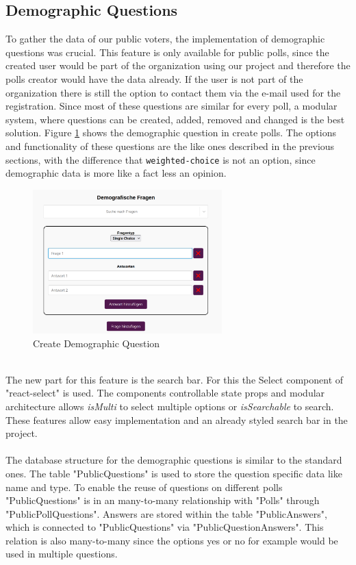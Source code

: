 \documentclass[a4paper,12pt]{report}
\begin{document}
\subsection{Demographic Questions}
To gather the data of our public voters, the implementation of demographic questions was crucial. This feature is only available for public polls, since the created user would be part of the organization using our project and therefore the polls creator would have the data already. If the user is not part of the organization there is still the option to contact them via the e-mail used for the registration. Since most of these questions are similar for every poll, a modular system, where questions can be created, added, removed and changed is the best solution. Figure \ref{fig:create_dem_que} shows the demographic question in create polls. The options and functionality of these questions are the like ones described in the previous sections, with the difference that \texttt{weighted-choice} is not an option, since demographic data is more like a fact less an opinion.
\begin{figure}[h!]
	\centering
	\includegraphics[width=0.65\textwidth]{pics/demographic_question_create.jpg}
	\caption{Create Demographic Question}
	\label{fig:create_dem_que}
\end{figure}
\\
The new part for this feature is the search bar. For this the Select component of "react-select" is used. The components controllable state props and modular architecture allows \textit{isMulti} to select multiple options or \textit{isSearchable} to search. These features allow easy implementation and an already styled search bar in the project. \parencite{reactselect}
\\ \\
The database structure for the demographic questions is similar to the standard ones. The table "PublicQuestions" is used to store the question specific data like name and type. To enable the reuse of questions on different polls "PublicQuestions" is in an many-to-many relationship with "Polls" through "PublicPollQuestions". Answers are stored within the table "PublicAnswers", which is connected to "PublicQuestions" via "PublicQuestionAnswers". This relation is also many-to-many since the options yes or no for example would be used in multiple questions. 
\end{document}
